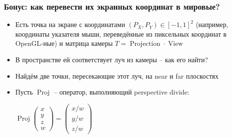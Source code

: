 \documentclass{beamer}
\begin{document}
\begin{frame}[fragile]
\frametitle{Бонус: как перевести их экранных координат в мировые?}
\begin{itemize}
\item Есть точка на экране с координатами \begin{math}(P_X, P_Y) \in [-1, 1]^2\end{math} (например, координаты указателя мыши, переведённые из пиксельных координат в OpenGL-ные) и матрица камеры \begin{math}T=\operatorname{Projection}\cdot\operatorname{View}\end{math}
\pause
\item В пространстве ей соответствует луч из камеры -- как его найти?
\pause
\item Найдём две точки, пересекающие этот луч, на near и far плоскостях
\pause
\item Пусть \begin{math}\operatorname{Proj}\end{math} -- оператор, выполняющий perspective divide:
\begin{center}
\begin{math}
\operatorname{Proj}\begin{pmatrix}x \\ y \\ z \\ w\end{pmatrix} = \begin{pmatrix}x/w \\ y/w \\ z/w\end{pmatrix}
\end{math}
\end{center}
\end{itemize}
\end{frame}
\end{document}
